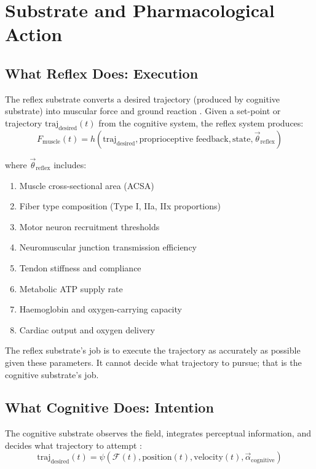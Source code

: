 \documentclass[11pt,twocolumn]{article}
\theoremstyle{definition}
\theoremstyle{remark}
\newcommand{\Field}{\mathcal{F}}
\begin{document}
\section{Substrate and Pharmacological Action}
\label{sec:substrate}

\subsection{What Reflex Does: Execution}

The reflex substrate converts a desired trajectory (produced by cognitive substrate) into muscular force and ground reaction \cite{enoka2015neuromechanics,winter2009biomechanics}. Given a set-point or trajectory $\text{traj}_{\text{desired}}(t)$ from the cognitive system, the reflex system produces:
\begin{equation}
F_{\text{muscle}}(t) = h(\text{traj}_{\text{desired}}, \text{proprioceptive feedback}, \text{state}, \vec{\theta}_{\text{reflex}})
\end{equation}

where $\vec{\theta}_{\text{reflex}}$ includes:
\begin{enumerate}[leftmargin=1.2em]
\item Muscle cross-sectional area (ACSA)
\item Fiber type composition (Type I, IIa, IIx proportions)
\item Motor neuron recruitment thresholds
\item Neuromuscular junction transmission efficiency
\item Tendon stiffness and compliance
\item Metabolic ATP supply rate
\item Haemoglobin and oxygen-carrying capacity
\item Cardiac output and oxygen delivery
\end{enumerate}

The reflex substrate's job is to execute the trajectory as accurately as possible given these parameters. It cannot decide what trajectory to pursue; that is the cognitive substrate's job.

\subsection{What Cognitive Does: Intention}

The cognitive substrate observes the field, integrates perceptual information, and decides what trajectory to attempt \cite{shadmehr2005biology,kahneman2011thinking,todorov2002finding}:
\begin{equation}
\text{traj}_{\text{desired}}(t) = \psi(\Field(t), \text{position}(t), \text{velocity}(t), \vec{\alpha}_{\text{cognitive}})
\end{equation}
\end{document}
